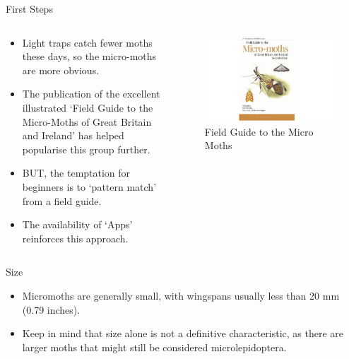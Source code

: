 \documentclass[
  ignorenonframetext,
]{beamer}
\providecommand{\tightlist}{%
  \setlength{\itemsep}{0pt}\setlength{\parskip}{0pt}}
\begin{document}
\begin{frame}{First Steps}
\protect\hypertarget{first-steps-1}{}
\begin{columns}[T]
\begin{column}{0.5\textwidth}
\begin{itemize}
\tightlist
\item
  Light traps catch fewer moths these days, so the micro-moths are more
  obvious.
\item
  The publication of the excellent illustrated `Field Guide to the
  Micro-Moths of Great Britain and Ireland' has helped popularise this
  group further.
\item
  BUT, the temptation for beginners is to `pattern match' from a field
  guide.
\item
  The availability of `Apps' reinforces this approach.
\end{itemize}
\end{column}

\begin{column}{0.5\textwidth}
\begin{figure}
\centering
\includegraphics{./images/micro-field-guide.jpg}
\caption{Field Guide to the Micro Moths}
\end{figure}
\end{column}
\end{columns}
\end{frame}

\begin{frame}{Size}
\protect\hypertarget{size}{}
\begin{itemize}
\tightlist
\item
  Micromoths are generally small, with wingspans usually less than 20 mm
  (0.79 inches).
\item
  Keep in mind that size alone is not a definitive characteristic, as
  there are larger moths that might still be considered
  microlepidoptera.
\end{itemize}
\end{frame}
\end{document}
